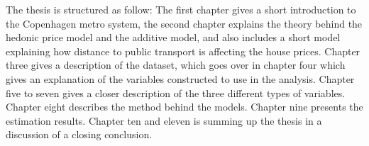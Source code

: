 The thesis is structured as follow: The first chapter gives a short
introduction to the Copenhagen metro system, the second chapter explains the 
theory behind the hedonic price model and the additive model, and also includes
a short model explaining how distance to public transport is affecting the 
house prices. Chapter three gives a description of the dataset, which goes over
in chapter four which gives an explanation of the variables constructed to use 
in the analysis. Chapter five to seven gives a closer description of the three 
different types of variables. Chapter eight describes the method behind the 
models. Chapter nine presents the estimation results. Chapter ten and eleven is 
summing up the thesis in a discussion of a closing conclusion. 
